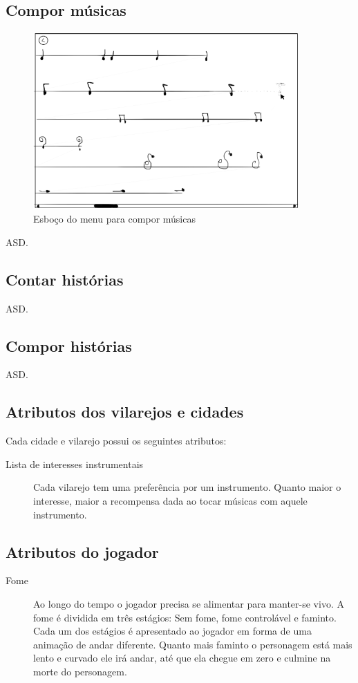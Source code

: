 \documentclass[12pt, 
openright, 
oneside, 
a4paper,    
brazil]{facom-ufu-abntex2}
\begin{document}
\subsection{Compor músicas}
\begin{figure}[H]
	\centering
	\includegraphics[width=4in]{imagens/mecanica_compormusica.png}
	\caption{Esboço do menu para compor músicas}
\end{figure}
ASD.
\subsection{Contar histórias}
ASD.
\subsection{Compor histórias}
ASD.
\subsection{Atributos dos vilarejos e cidades}
Cada cidade e vilarejo possui os seguintes atributos:
\begin{description}  
\item [Lista de interesses instrumentais] Cada vilarejo tem uma preferência por um instrumento. Quanto maior o interesse, maior a recompensa dada ao tocar músicas com aquele instrumento.
\end{description}

\subsection{Atributos do jogador}
\begin{description}  
\item [Fome] Ao longo do tempo o jogador precisa se alimentar para manter-se vivo. A fome é dividida em três estágios: Sem fome, fome controlável e faminto. Cada um dos estágios é
apresentado ao jogador em forma de uma animação de andar diferente. Quanto mais faminto o personagem está mais lento e curvado ele irá andar, até que ela chegue em zero e culmine na morte do personagem.
\end{description}
\end{document}
